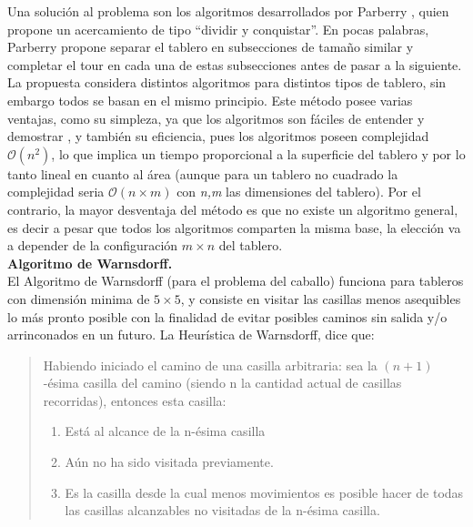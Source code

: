 \documentclass[journal, 10pt]{IEEEtran}
\begin{document}
Una solución al problema son los algoritmos desarrollados por Parberry \cite{Parberry:1997}, quien propone un acercamiento de tipo “dividir y conquistar”. En pocas palabras, Parberry propone separar el tablero en subsecciones de tamaño similar y completar el tour en cada una de estas subsecciones antes de pasar a la siguiente. La propuesta considera distintos algoritmos para distintos tipos de tablero, sin embargo todos se basan en el mismo principio. Este método posee varias ventajas, como su simpleza, ya que los algoritmos son fáciles de entender y demostrar \cite{Parberry:1997}, y también su eficiencia, pues los algoritmos poseen complejidad $\mathcal{O}(n^2)$, lo que implica un tiempo proporcional a la superficie del tablero y por lo tanto lineal en cuanto al área (aunque para un tablero no cuadrado la complejidad seria $\mathcal{O}(n\times m) $ con \textit{n,m} las dimensiones del tablero). Por el contrario, la mayor desventaja del método es que no existe un algoritmo general, es decir a pesar que todos los algoritmos comparten la misma base, la elección va a depender de la configuración $m\times n$ del tablero.\\
\textbf{Algoritmo de Warnsdorff.}\\
El Algoritmo de Warnsdorff (para el problema del caballo) funciona para tableros con dimensión minima de $5\times 5$, y consiste en visitar las casillas menos asequibles lo más pronto posible con la finalidad de evitar posibles caminos sin salida y/o arrinconados en un futuro. La Heurística de Warnsdorff\cite{Squirrel:1996}, dice que:
\begin{quote}
	Habiendo iniciado el camino de una casilla arbitraria: sea la $(n+1)$-ésima casilla del camino (siendo n la cantidad actual de casillas recorridas), entonces esta casilla:
	\begin{enumerate}
		\item Está al alcance de la n-ésima casilla
		\item Aún no ha sido visitada previamente.
		\item Es la casilla desde la cual menos movimientos es posible hacer de todas las casillas alcanzables no visitadas de la n-ésima casilla.
\end{enumerate}
\end{quote}
\end{document}
